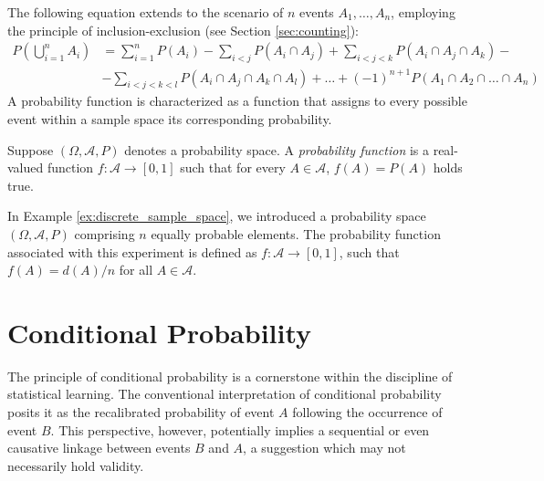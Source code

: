 The following equation extends to the scenario of $n$ events $A_1, \ldots, A_n$, employing the principle of inclusion-exclusion (see Section \ref{sec:counting}):
\begin{equation*}
\begin{split}
P \left( \bigcup_{i=1}^n A_i \right) & = \sum_{i=1}^n P \left( A_i \right) - \sum_{i<j} P \left( A_i \cap A_j \right) + \sum_{i<j<k} P \left( A_i \cap A_j \cap A_k \right) - \\
&  - \sum_{i<j<k<l} P \left( A_i \cap A_j \cap A_k \cap A_l \right) + \ldots +  (-1)^{n+1} P \left( A_1 \cap A_2 \cap \ldots \cap A_n \right) 
\end{split}
\end{equation*}
A probability function is characterized as a function that assigns to every possible event within a sample space its corresponding probability.

\begin{definition}
\label{def:probability_function}
Suppose $\left( \Omega, \mathcal{A} , P \right)$ denotes a probability space. A \emph{probability function} is a real-valued function $f : \mathcal{A} \rightarrow [0, 1]$ such that for every $A \in \mathcal{A}$, $f \left( A \right) = P \left( A \right)$ holds true.
\end{definition}

In Example \ref{ex:discrete_sample_space}, we introduced a probability space $\left( \Omega, \mathcal{A}, P \right)$ comprising $n$ equally probable elements. The probability function associated with this experiment is defined as $f : \mathcal{A} \rightarrow [0, 1]$, such that $f \left( A \right) = d\left( A \right)/n$ for all $A \in \mathcal{A}$.

%
%

\section{Conditional Probability}
\label{sec:probability_conditional}

The principle of conditional probability is a cornerstone within the discipline of statistical learning. The conventional interpretation of conditional probability posits it as the recalibrated probability of event $A$ following the occurrence of event $B$. This perspective, however, potentially implies a sequential or even causative linkage between events $B$ and $A$, a suggestion which may not necessarily hold validity.

